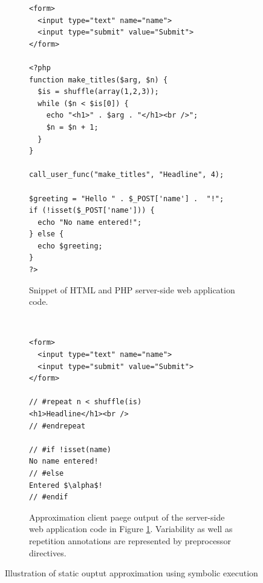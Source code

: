\documentclass[preprint]{sig-alternate-05-2015}
\begin{document}
\begin{figure}[t]
	\centering
	\begin{subfigure}[center]{0.48\textwidth}%
\begin{lstlisting}
<form>
  <input type="text" name="name">
  <input type="submit" value="Submit">
</form>

<?php
function make_titles($arg, $n) {
  $is = shuffle(array(1,2,3));
  while ($n < $is[0]) {
    echo "<h1>" . $arg . "</h1><br />";
    $n = $n + 1;
  }
}
  
call_user_func("make_titles", "Headline", 4);

$greeting = "Hello " . $_POST['name'] .  "!";
if (!isset($_POST['name'])) {
  echo "No name entered!";
} else {
  echo $greeting;
}
?>
\end{lstlisting}
		\caption{Snippet of HTML and PHP server-side web application code.
		\label{fig:web_application}}
    \end{subfigure}

	\vspace{2mm}    
    
    ~ %
    \begin{subfigure}[center]{0.48\textwidth}
\begin{lstlisting}[mathescape]
<form>
  <input type="text" name="name">
  <input type="submit" value="Submit">
</form>

// #repeat n < shuffle(is)
<h1>Headline</h1><br />
// #endrepeat

// #if !isset(name)
No name entered!
// #else
Entered $\alpha$!
// #endif

\end{lstlisting}
		\caption{
			Approximation client paege output of the server-side web application code in
			Figure \ref{fig:web_application}. Variability as well as repetition annotations
			are represented by preprocessor directives.
			\label{fig:output_example}
		}
    \end{subfigure}
    \vspace{2mm}
    \caption{
    	Illustration of static ouptut approximation using symbolic
    	execution
    	\label{fig:code_example}
    }
\end{figure}
\end{document}
